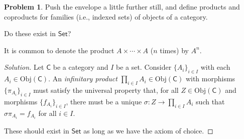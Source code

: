 \documentclass[fontsize=14pt]{scrartcl}
\theoremstyle{definition}
\newtheorem{problem-internal}{Problem}[subsection]
\newenvironment{problem}{
  \medskip
  \begin{problem-internal}
}{
  \end{problem-internal}
}
\newenvironment{solution}{
  \begin{proof}[Solution]
  \vspace{-8px}
  \setlength{\parskip}{4px}
  \setlength{\parindent}{0px}
}{
  \end{proof}
}
\newcommand{\Obj}{\mathrm{Obj}}
\begin{document}
\begin{problem}
\def \Set {\mathsf{Set}}
Push the envelope a little further still, and define products and coproducts
for families (i.e., indexed sets) of objects of a category.

Do these exist in $\Set$?

It is common to denote the product $A\times\cdots\times A$ ($n$ times) by $A^n$.
\end{problem}
\begin{solution}
\def \C {\mathsf{C}}
\def \Set {\mathsf{Set}}
Let $\C$ be a category and $I$ be a set. Consider $\{A_i\}_{i\in I}$ with each
$A_i\in\Obj(\C)$. An \textit{infinitary product} $\prod_{i\in I}
A_i\in\Obj(\C)$ with morphisms $\{\pi_{A_i}\}_{i\in I}$ must satisfy the
universal property that, for all $Z\in\Obj(\C)$ and morphisms $\{f_{A_i}\}_{i\in
I}$, there must be a unique $\sigma:Z\to\prod_{i\in I}A_i$ such that
$\sigma\pi_{A_i}=f_{A_i}$ for all $i\in I$.

These should exist in $\Set$ as long as we have the axiom of choice.
\end{solution}
\end{document}
